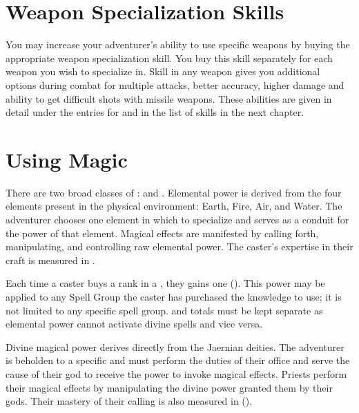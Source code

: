 \setlength{\columnsep}{\defcolwidth}
\begin{multicols}{2}
\section{Weapon Specialization Skills}
You may increase your adventurer's ability to use specific weapons by buying the appropriate weapon specialization skill. You buy this skill separately for each weapon you wish to specialize in. Skill in any weapon gives you additional options during combat for multiple attacks, better accuracy, higher damage and ability to get difficult shots with missile weapons. These abilities are given in detail under the entries for  and  in the list of skills in the next chapter.
\section{Using Magic}
There are two broad classes of :  and . Elemental power is derived from the four elements present in the physical environment: Earth, Fire, Air, and Water. The adventurer chooses one element in which to specialize and serves as a conduit for the power of that element. Magical effects are manifested by calling forth, manipulating, and controlling raw elemental power. The caster's expertise in their craft is measured in .

Each time a caster buys a rank in a , they gains one  (\EU). This power may be applied to any Spell Group the caster has purchased the knowledge to use; it is not limited to any specific spell group.   and  totals must be kept separate as elemental power cannot activate divine spells and vice versa.

Divine magical power derives directly from the Jaernian deities. The adventurer is beholden to a specific  and must perform the duties of their office and serve the cause of their god to receive the power to invoke magical effects. Priests perform their magical effects by manipulating the divine power granted them by their gods. Their mastery of their calling is also measured in  (\DU).

\end{multicols}
